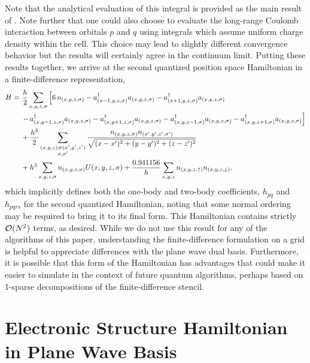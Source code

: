 \documentclass[superscriptaddress,aps,pra,nofootinbib,notitlepage,10pt,longbibliography]{revtex4-1}
\begin{document}
Note that the analytical evaluation of this integral is provided as the main result of \cite{Ciftja2011}. Note further that one could also choose to evaluate the long-range Coulomb interaction between orbitals $p$ and $q$ using integrals which assume uniform charge density within the cell. This choice may lead to slightly different convergence behavior but the results will certainly agree in the continuum limit. Putting these results together, we arrive at the second quantized position space Hamiltonian in a finite-difference representation,
\begin{align}
H =  \, &  \, \frac{h}{2} \sum_{x,y,z,\sigma} \left[ 6 \, n_{(x,y,z,\sigma)}
%
- a_{(x-1 ,y,z,\sigma)}^\dagger a_{(x,y,z,\sigma)} - a_{(x+1,y,z,\sigma)}^\dagger a_{(x,y,z,\sigma)} \right. \\
%
& \left.- \, a_{(x,y-1,z,\sigma)}^\dagger a_{(x,y,z,\sigma)} - a_{(x,y+1,z,\sigma)}^\dagger a_{(x,y,z,\sigma)}
%
- a_{(x,y,z-1,\sigma)}^\dagger a_{(x,y,z,\sigma)} - a_{(x,y,z+1 ,\sigma)}^\dagger a_{(x,y,z,\sigma)}\right] \nonumber\\
%
& + \frac{h^3}{2} \sum_{\substack{(x, y, z) \neq (x', y', z') \\ \sigma, \sigma'}} \frac{n_{(x,y,z,\sigma)} n_{(x',y',z',\sigma')}}{\sqrt{(x - x')^2 + (y - y')^2 + (z - z')^2 }} \notag \\
%
&+ h^3 \sum_{x,y,z,\sigma} n_{(x,y,z,\sigma)} U(x,y,z,\sigma)
%
+ \frac{0.941156}{h} \sum_{x,y,z} n_{(x,y,z, \uparrow)} n_{(x,y,z, \downarrow)} .\nonumber
 \end{align}
which implicitly defines both the one-body and two-body coefficients, $h_{pq}$ and $h_{pqrs}$ for the second quantized Hamiltonian, noting that some normal ordering may be required to bring it to its final form.  This Hamiltonian contains strictly ${\cal O}(N^2)$ terms, as desired. While we do not use this result for any of the algorithms of this paper, understanding the finite-difference formulation on a grid is helpful to appreciate differences with the plane wave dual basis. Furthermore, it is possible that this form of the Hamiltonian has advantages that could make it easier to simulate in the context of future quantum algorithms, perhaps based on 1-sparse decompositions of the finite-difference stencil.
 

\section{Electronic Structure Hamiltonian in Plane Wave Basis}
\label{app:plane_waves}
\end{document}
